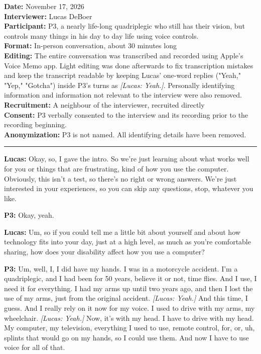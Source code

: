 \textbf{Date:} November 17, 2026
\\\textbf{Interviewer:} Lucas DeBoer
\\\textbf{Participant:} P3, a nearly life-long quadriplegic who still has their vision, but controls many things in his day to day life using voice controls.
\\\textbf{Format:} In-person conversation, about 30 minutes long
\\\textbf{Editing:} The entire conversation was transcribed and recorded using Apple's Voice Memo app. Light editing was done afterwards to fix transcription mistakes and keep the transcript readable by keeping Lucas' one-word replies ("Yeah," "Yep," "Gotcha") inside P3's turns as \textit{[Lucas: Yeah.]}. Personally identifying information and information not relevant to the interview were also removed.
\\\textbf{Recruitment:} A neighbour of the interviewer, recruited directly
\\\textbf{Consent:} P3 verbally consented to the interview and its recording prior to the recording beginning.
\\\textbf{Anonymization:} P3 is not named. All identifying details have been removed.

\bigskip
\hrule
\bigskip

\textbf{Lucas:} Okay, so, I gave the intro. So we're just learning about what works well for you or things that are frustrating, kind of how you use the computer. Obviously, this isn't a test, so there's no right or wrong answers. We're just interested in your experiences, so you can skip any questions, stop, whatever you like. 

\textbf{P3:} Okay, yeah. 

\textbf{Lucas:} Um, so if you could tell me a little bit about yourself and about how technology fits into your day, just at a high level, as much as you're comfortable sharing, how does your disability affect how you use a computer? 

\textbf{P3:} Um, well, I, I did have my hands. I was in a motorcycle accident. I'm a quadriplegic, and I had been for 50 years, believe it or not, time flies. And I use, I need it for everything. I had my arms up until two years ago, and then I lost the use of my arms, just from the original accident. \textit{[Lucas: Yeah.]} And this time, I guess. And I really rely on it now for my voice. I used to drive with my arms, my wheelchair. \textit{[Lucas: Yeah.]} Now, it's with my head. I have to drive with my head. My computer, my television, everything I used to use, remote control, for, or, uh, splints that would go on my hands, so I could use them. And now I have to use voice for all of that. 

